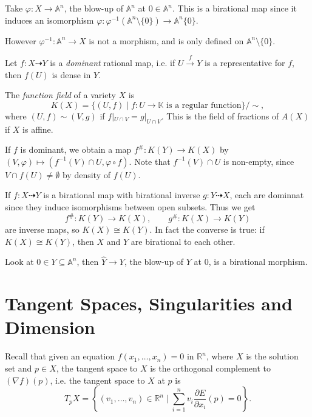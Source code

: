 \documentclass[12pt]{article}
\begin{document}
\begin{exbox}
	Take $\varphi : X \to \mathbb{A}^n$, the blow-up of $\mathbb{A}^n$ at $0 \in \mathbb{A}^n$. This is a birational map since it induces an isomorphism $\varphi : \varphi^{-1}(\mathbb{A}^n \setminus \{0\}) \to \mathbb{A}^n \{0\}$.

	However $\varphi^{-1} : \mathbb{A}^n \to X$ is not a morphism, and is only defined on $\mathbb{A}^n \setminus \{0\}$.
\end{exbox}

\begin{remark}
	Let $f : X \dashrightarrow Y$ is a \emph{dominant} rational map, i.e. if $U \overset f \to Y$ is a representative for $f$, then $f(U)$ is dense in $Y$.
\end{remark}

\begin{definition}
	The \emph{function field} of a variety $X$ is
	\[
		K(X) = \{(U, f) \mid f : U \to \mathbb{K} \text{ is a regular function}\}/\sim,
	\]
	where $(U, f) \sim (V, g)$ if $f|_{U \cap V} = g|_{U \cap V}$. This is the field of fractions of $A(X)$ if $X$ is affine.

	If $f$ is dominant, we obtain a map $f^\# : K(Y) \to K(X)$ by $(V, \varphi) \mapsto (f^{-1}(V) \cap U, \varphi \circ f)$. Note that $f^{-1}(V) \cap U$ is non-empty, since $V \cap f(U) \neq \emptyset$ by density of $f(U)$.
\end{definition}

If $f : X \dashrightarrow Y$ is a birational map with birational inverse $g : Y \dashrightarrow X$, each are dominnat since they induce isomorphisms between open subsets. Thus we get
\[
f^\# : K(Y) \to K(X), \qquad g^\# : K(X) \to K(Y)
\]
are inverse maps, so $K(X) \cong K(Y)$. In fact the converse is true: if $K(X) \cong K(Y)$, then $X$ and $Y$ are birational to each other.

\begin{exbox}
	Look at $0 \in Y \subseteq \mathbb{A}^n$, then $\hat Y \to Y$, the blow-up of $Y$ at $0$, is a birational morphism.
\end{exbox}

\newpage

\section{Tangent Spaces, Singularities and Dimension}
\label{sec:ts_s_d}

Recall that given an equation $f(x_1, \ldots, x_n) = 0$ in $\mathbb{R}^n$, where $X$ is the solution set and $p \in X$, the tangent space to $X$ is the orthogonal complement to $(\nabla f)(p)$, i.e. the tangent space to $X$ at $p$ is
\[
	T_p X = \left\{(v_1, \ldots, v_n) \in \mathbb{R}^n \mid \sum_{i = 1}^n v_i \frac{\partial E}{\partial x_i}(p) = 0 \right\}.
\]
\end{document}
